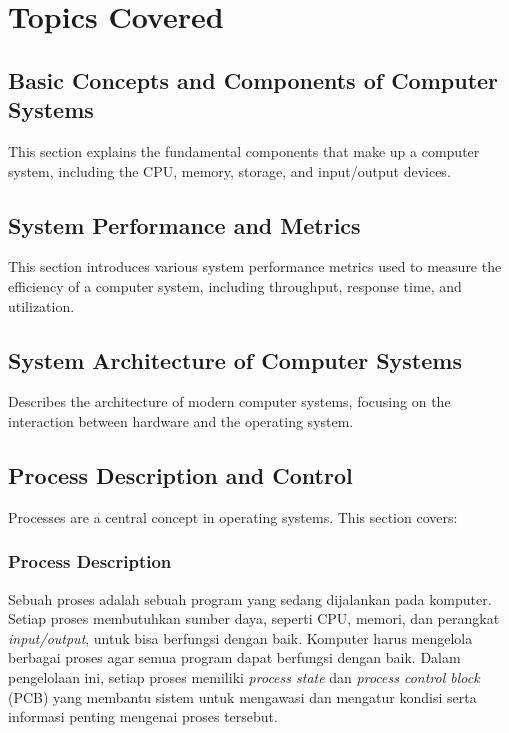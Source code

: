 \documentclass[12pt]{article}
\begin{document}
\section{Topics Covered}

\subsection{Basic Concepts and Components of Computer Systems}
This section explains the fundamental components that make up a computer system, including the CPU, memory, storage, and input/output devices.

\subsection{System Performance and Metrics}
This section introduces various system performance metrics used to measure the efficiency of a computer system, including throughput, response time, and utilization.

\subsection{System Architecture of Computer Systems}
Describes the architecture of modern computer systems, focusing on the interaction between hardware and the operating system.

\subsection{Process Description and Control}
Processes are a central concept in operating systems. This section covers:
    \subsubsection{Process Description}
    Sebuah proses adalah sebuah program yang sedang dijalankan pada komputer. Setiap proses membutuhkan sumber daya, seperti CPU, memori, dan perangkat \textit{input/output}, untuk bisa berfungsi dengan baik. Komputer harus mengelola berbagai proses agar semua program dapat berfungsi dengan baik. Dalam pengelolaan ini, setiap proses memiliki \textit{process state} dan \textit{process control block} (PCB) yang membantu sistem untuk mengawasi dan mengatur kondisi serta informasi penting mengenai proses tersebut.
\end{document}
